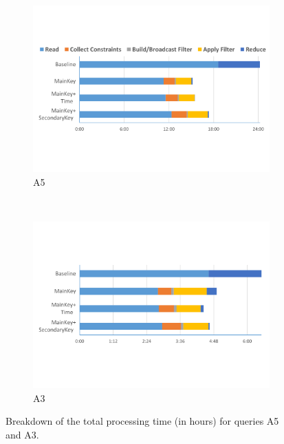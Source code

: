 \begin{figure}[tp]
\centering

\begin{subfigure}[t]{\columnwidth}
\includegraphics[clip, trim=0.8cm 3.5cm 0.9cm 2.15cm,
width=\columnwidth]{graphs/A5_breakdown.pdf}
\caption{A5}
\label{fig:A5}
\end{subfigure}
~
\begin{subfigure}[t]{\columnwidth}
\includegraphics[clip, trim=0.8cm 4cm 0.9cm 4cm,
width=\columnwidth]{graphs/A3_breakdown.pdf}
\caption{A3}
\label{fig:A3}
\end{subfigure}

\caption{Breakdown of the total processing time (in hours) for queries A5 and
A3.}
\label{fig:breakdown}
\end{figure}


